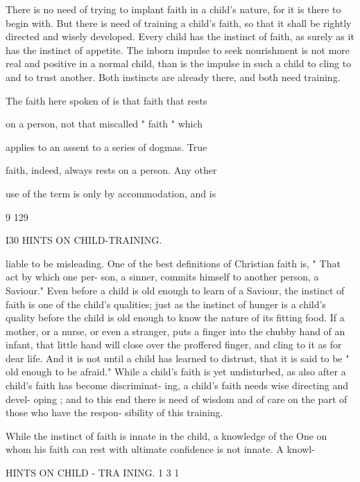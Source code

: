 \documentclass[
]{book}
\begin{document}
There is no need of trying to implant faith in a child's nature, for it is there to begin with. But there is need of training a child's faith, so that it shall be rightly directed and wisely developed. Every child has the instinct of faith, as surely as it has the instinct of appetite. The inborn impulse to seek nourishment is not more real and positive in a normal child, than is the impulse in such a child to cling to and to trust another. Both instincts are already there, and both need training.

The faith here spoken of is that faith that rests

on a person, not that miscalled " faith " which

applies to an assent to a series of dogmas. True

faith, indeed, always rests on a person. Any other

use of the term is only by accommodation, and is

9 129

I30 HINTS ON CHILD-TRAINING.

liable to be misleading. One of the best definitions of Christian faith is, " That act by which one per- son, a sinner, commits himself to another person, a Saviour." Even before a child is old enough to learn of a Saviour, the instinct of faith is one of the child's qualities; just as the instinct of hunger is a child's quality before the child is old enough to know the nature of its fitting food. If a mother, or a nurse, or even a stranger, puts a finger into the chubby hand of an infant, that little hand will close over the proffered finger, and cling to it as for dear life. And it is not until a child has learned to distrust, that it is said to be " old enough to be afraid." While a child's faith is yet undisturbed, as also after a child's faith has become discriminat- ing, a child's faith needs wise directing and devel- oping ; and to this end there is need of wisdom and of care on the part of those who have the respon- sibility of this training.

While the instinct of faith is innate in the child, a knowledge of the One on whom his faith can rest with ultimate confidence is not innate. A knowl-

HINTS ON CHILD - TRA INING. 1 3 1
\end{document}
